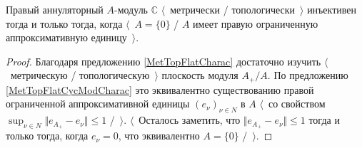 \begin{proposition}\label{MetTopInjModCCharac} Правый аннуляторный $A$-модуль $\mathbb{C}$ $\langle$~метрически / топологически~$\rangle$ инъективен тогда и только тогда, когда $\langle$~$A=\{0\}$ / $A$  имеет правую ограниченную аппроксимативную единицу~$\rangle$.
\end{proposition}
\begin{proof} Благодаря предложению \ref{MetTopFlatCharac} достаточно изучить $\langle$~метрическую / топологическую~$\rangle$ плоскость модуля $A_+/A$. По предложению \ref{MetTopFlatCycModCharac} это эквивалентно существованию правой ограниченной аппроксимативной единицы $(e_\nu)_{\nu\in N}$ в $A$ $\langle$~со свойством $\sup_{\nu\in N}\Vert e_{A_+}-e_\nu\Vert\leq 1$ /~$\rangle$. $\langle$~Осталось заметить, что $\Vert e_{A_+}-e_\nu\Vert\leq 1$ тогда и только тогда, когда $e_\nu=0$, что эквивалентно $A=\{0\}$ /~$\rangle$.
\end{proof}


